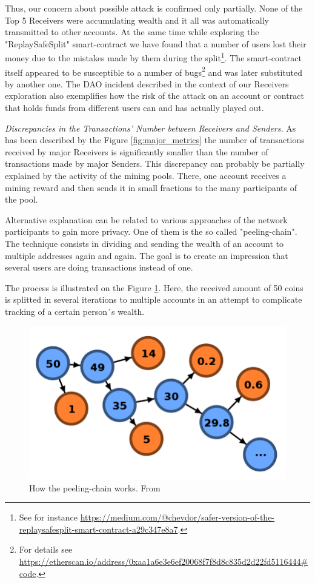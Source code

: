 Thus, our concern about possible attack is confirmed only partially.
None of the Top 5 Receivers were accumulating wealth and it all was automatically transmitted to other accounts.
At the same time while exploring the "ReplaySafeSplit" smart-contract we have found that a number of users lost their money due to the mistakes made by them during the split\footnote{See for instance \url{https://medium.com/@chevdor/safer-version-of-the-replaysafesplit-smart-contract-a29c347e8a7}.}.
The smart-contract itself appeared to be susceptible to a number of bugs\footnote{For details see \url{https://etherscan.io/address/0xaa1a6e3e6ef20068f7f8d8c835d2d22fd5116444\#code}.} and was later substituted by another one.
The DAO incident described in the context of our Receivers exploration also exemplifies how the risk of the attack on an account or contract that holds funds from different users can and has actually played out.

\textit{Discrepancies in the Transactions' Number between Receivers and Senders.} 
As has been described by the Figure \ref{fig:major_metrics} the number of transactions received by major Receivers is significantly smaller than the number of transactions made by major Senders.
This discrepancy can probably be partially explained by the activity of the mining pools.
There, one account receives a mining reward and then sends it in small fractions to the many participants of the pool.

Alternative explanation can be related to various approaches of the network participants to gain more privacy.
One of them is the so called "peeling-chain".
The technique consists in dividing and sending the wealth of an account to multiple addresses again and again.
The goal is to create an impression that several users are doing transactions instead of one.

The process is illustrated on the Figure \ref{fig:peeling_chain}.
Here, the received amount of 50 coins is splitted in several iterations to multiple accounts in an attempt to complicate tracking of a certain person´s wealth.

\begin{figure}[h]
  \centering
  \includegraphics[width=\linewidth]{figures/peelingchain.png}
  \caption{How the peeling-chain works. From \cite{balthasar2017laundary}}
  \label{fig:peeling_chain}
\end{figure}


